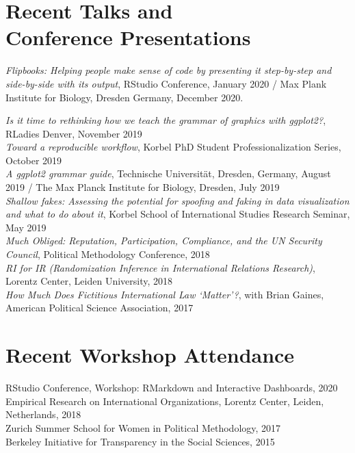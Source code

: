\documentclass[margin, 10pt]{CVStyleTemplate}\usepackage[]{graphicx}\usepackage[dvipsnames]{xcolor}
\begin{document}
\begin{resume}
%
%
%


\section{Recent Talks and \\ Conference Presentations}



\emph{Flipbooks: Helping people make sense of code by presenting it step-by-step and side-by-side with its output},
RStudio Conference, January 2020 /
Max Plank Institute for Biology, Dresden Germany, December 2020.

%
\emph{Is it time to rethinking how we teach the grammar of graphics with ggplot2?}, RLadies Denver, November 2019\\[6pt]
%
\emph{Toward a reproducible workflow},  Korbel PhD Student Professionalization Series, October 2019 \\[6pt]
%
\emph{A ggplot2 grammar guide}, Technische Universit\"{a}t, Dresden, Germany, August 2019 / The Max Planck Institute for Biology, Dresden, July 2019 \\[6pt]
%
\emph{Shallow fakes: Assessing the potential for spoofing and faking in data visualization and what to do about it}, Korbel School of International Studies Research Seminar, May 2019 \\[6pt]
%
\emph{Much Obliged: Reputation, Participation, Compliance, and the UN Security Council}, Political Methodology Conference, 2018 \\[6pt]
%
\emph{RI for IR (Randomization Inference in International Relations Research)}, Lorentz Center, Leiden University, 2018\\[6pt] %
%
\emph{How Much Does Fictitious International Law `Matter'?}, with Brian Gaines, American Political Science Association, 2017 \\[6pt]%


\section{Recent Workshop Attendance}

RStudio Conference, Workshop: RMarkdown and Interactive Dashboards, 2020 \\[6pt]
Empirical Research on International Organizations, Lorentz Center, Leiden, Netherlands, 2018 \\[6pt]
Zurich Summer School for Women in Political Methodology, 2017\\[6pt]
Berkeley Initiative for Transparency in the Social Sciences, 2015\\[6pt]%


\end{resume}
\end{document}

